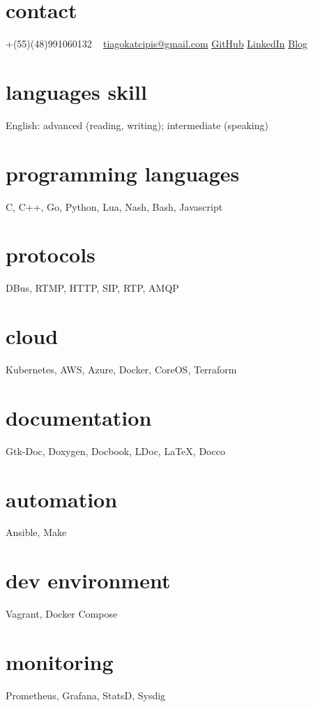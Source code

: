 \documentclass[]{friggeri-cv} %
\begin{document}


\begin{aside} %
\section{contact}
+(55)(48)991060132
~
\href{mailto:tiagokatcipis@gmail.com}{tiagokatcipis@gmail.com}
\href{https://github.com/katcipis}{GitHub}
\href{http://www.linkedin.com/pub/tiago-katcipis/1b/273/8b0}{LinkedIn}
\href{http://katcipis.github.io/}{Blog}
\section{languages skill}
English: advanced (reading, writing); intermediate (speaking)
\section{programming languages}
C, C++, Go, Python, Lua, Nash, Bash, Javascript
\section{protocols}
DBus, RTMP, HTTP, SIP, RTP, AMQP
\section{cloud}
Kubernetes, AWS, Azure, Docker, CoreOS, Terraform
\section{documentation}
Gtk-Doc, Doxygen, Docbook, LDoc, LaTeX, Docco
\section{automation}
Ansible, Make
\section{dev environment}
Vagrant, Docker Compose
\section{monitoring}
Prometheus, Grafana, StatsD, Sysdig
\end{aside}
\end{document}
